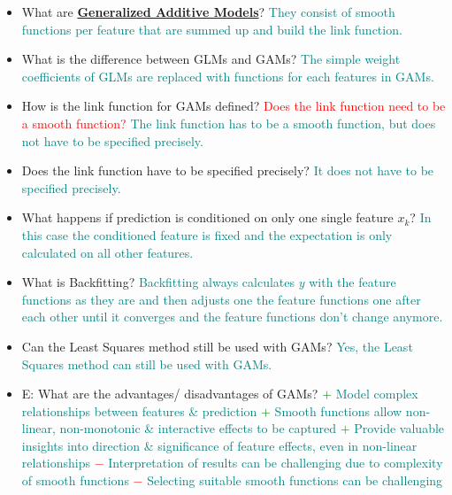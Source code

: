 \documentclass{report}
\newcommand{\asw}[2][teal]{}
\renewcommand{\asw}[2][teal]{\textcolor{#1}{#2}}
\newcommand{\qst}[2][red]{\textcolor{#1}{#2}}
\begin{document}
\begin{itemize}
	\item What are \textbf{\underline{Generalized Additive Models}}?
	\asw{\newline They consist of smooth functions per feature that are summed up and build the link function.}
	\item What is the difference between GLMs and GAMs?
	\asw{\newline The simple weight coefficients of GLMs are replaced with functions for each features in GAMs.}
	\item How is the link function for GAMs defined? \qst{Does the link function need to be a smooth function?}
	\asw{\newline The link function has to be a smooth function, but does not have to be specified precisely.}
	\item Does the link function have to be specified precisely?
	\asw{\newline It does not have to be specified precisely.}
	\item What happens if prediction is conditioned on only one single feature $x_k$?
	\asw{\newline In this case the conditioned feature is fixed and the expectation is only calculated on all other features.}
	\item What is Backfitting?
	\asw{\newline Backfitting always calculates $y$ with the feature functions as they are and then adjusts one the feature functions one after each other until it converges and the feature functions don't change anymore.}
	\item Can the Least Squares method still be used with GAMs?
	\asw{\newline Yes, the Least Squares method can still be used with GAMs.}
	\item E: What are the advantages/ disadvantages of GAMs?
	\asw{\newline \textcolor{green}{$+$} Model complex relationships between features \& prediction
		\newline \textcolor{green}{$+$} Smooth functions allow non-linear, non-monotonic \& interactive effects to be captured
		\newline \textcolor{green}{$+$} Provide valuable insights into direction \& significance of feature effects, even in non-linear relationships
		\newline \textcolor{red}{$-$} Interpretation of results can be challenging due to complexity of smooth functions
		\newline \textcolor{red}{$-$} Selecting suitable smooth functions can be challenging}
	
	\end{itemize}
\end{document}
